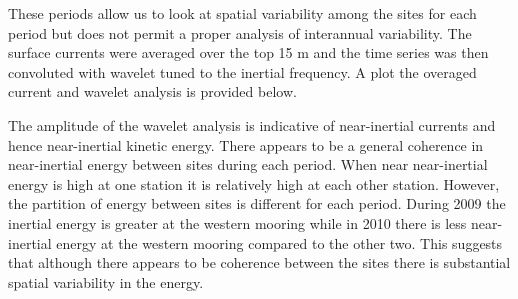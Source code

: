 These periods allow us to look at spatial variability among the sites for each period but does not permit a proper analysis  of interannual variability. 
The surface currents were averaged over the top 15 m and the time series was then convoluted with  wavelet tuned to the inertial frequency. 
A plot the overaged current and wavelet analysis is provided below.


The amplitude of the wavelet analysis is indicative of near-inertial currents and hence near-inertial kinetic energy. There appears to be a general
coherence in near-inertial energy between sites during each period. When near near-inertial energy is high at one station it is relatively high at each other station.
However, the partition of energy between sites is different for each period. During 2009 the inertial energy is greater at the western mooring while in 2010 there 
is less near-inertial energy at the western mooring compared to the other two. This suggests that although there appears to be coherence between the sites
there is substantial spatial variability in the energy. 



